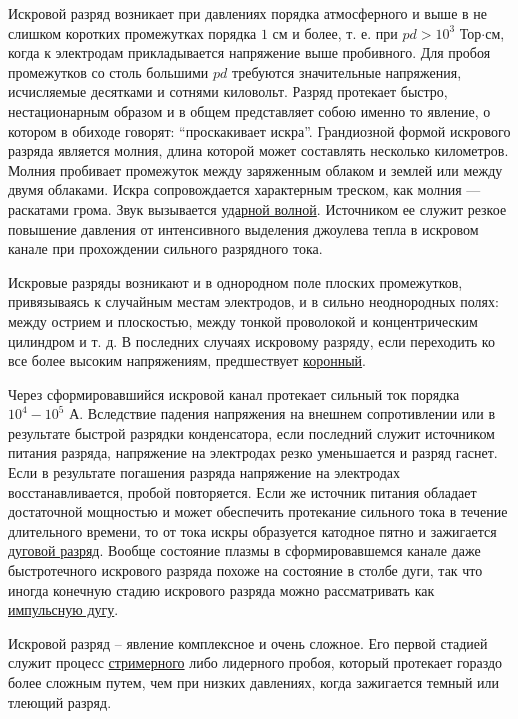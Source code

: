 \documentclass[10pt, a4paper]{article}
\begin{document}
Искровой разряд возникает при давлениях порядка атмосферного и выше в не слишком коротких промежутках порядка $1$ см и более, т. е. при $pd>10^3$ Тор$\cdot$см, когда к электродам прикладывается напряжение выше пробивного. Для пробоя промежутков со столь большими $pd$ требуются значительные напряжения, исчисляемые десятками и сотнями киловольт. Разряд протекает быстро, нестационарным образом и в общем представляет собою именно то явление, о котором в обиходе говорят: ``проскакивает искра''. Грандиозной формой искрового разряда является молния, длина которой может составлять несколько километров. Молния пробивает промежуток между заряженным облаком и землей или между двумя облаками. Искра сопровождается характерным треском, как молния — раскатами грома. Звук вызывается \uline{ударной волной}. Источником ее служит резкое повышение давления от интенсивного выделения джоулева тепла в искровом канале при прохождении сильного разрядного тока.

Искровые разряды возникают и в однородном поле плоских промежутков, привязываясь к случайным местам электродов, и в сильно неоднородных полях: между острием и плоскостью, между тонкой проволокой и концентрическим цилиндром и т. д. В последних случаях искровому разряду, если переходить ко все более высоким напряжениям, предшествует \uline{коронный}.

Через сформировавшийся искровой канал протекает сильный ток порядка $10^4-10^5$ А. Вследствие падения напряжения на внешнем сопротивлении или в результате быстрой разрядки конденсатора, если последний служит источником питания разряда, напряжение на электродах резко уменьшается и разряд гаснет. Если в результате погашения разряда напряжение на электродах восстанавливается, пробой повторяется. Если же источник питания обладает достаточной мощностью и может обеспечить протекание сильного тока в течение длительного времени, то от тока искры образуется катодное пятно и зажигается \uline{дуговой разряд}. Вообще состояние плазмы в сформировавшемся канале даже быстротечного искрового разряда похоже на состояние в столбе дуги, так что иногда конечную стадию искрового разряда можно рассматривать как \uline{импульсную дугу}.

Искровой разряд -- явление комплексное и очень сложное. Его первой стадией служит процесс \uline{стримерного} либо лидерного пробоя, который протекает гораздо более сложным путем, чем при низких давлениях, когда зажигается темный или тлеющий разряд.
\end{document}
